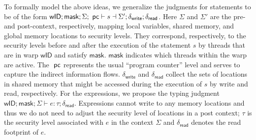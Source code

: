 
To formally model the above ideas, we generalize the judgments for statements to be of the form
$\mathsf{wID}; \mathsf{mask};\Sigma; ~\mathsf{pc} \vdash s  \dashv \Sigma'; \delta_\mathsf{write}; \delta_\mathsf{read}$.
%
Here $\Sigma$ and $\Sigma'$ are the pre- and post-context, respectively, mapping local variables, shared memory, and global memory locations to security levels.
%
They correspond, respectively, to the security levels before and after the execution of the statement $s$ by threads that are in warp $\mathsf{wID}$ and satisfy $\mathsf{mask}$.
$\mathsf{mask}$ indicates which threads within the warp are active.
The $~\mathsf{pc}$ represents the usual ``program counter'' level and serves to capture the indirect information flows.
$\delta_\mathsf{write}$ and  $\delta_{\mathsf{read}}$ collect the sets of locations in shared memory that might be accessed during the execution of $s$ by write and read, respectively.
%
For the expressions, we propose the  typing judgment $\mathsf{wID}; \mathsf{mask};\Sigma \vdash e: \tau; \delta_{\mathsf{read}}$.  Expressions cannot write to any memory locations and thus we do not need to adjust the security level of  locations in a post context; $\tau$ is the security level associated with $e$ in the context $\Sigma$ and $\delta_{\mathsf{read}}$ denotes the read footprint of $e$.


%

%
%
% 
%
%

%
%

